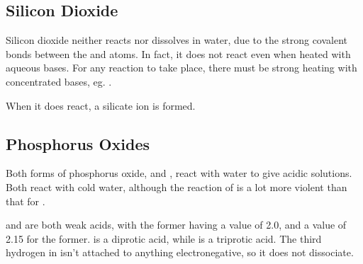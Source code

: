 


		\subsection{Silicon Dioxide}

			Silicon dioxide neither reacts nor dissolves in water, due to the strong covalent bonds between the  and  atoms.
			In fact, it does not react even when heated with aqueous bases. For any reaction to take place, there must be strong heating
			with concentrated bases, eg. .


			When it does react, a silicate ion is formed.




		\pagebreak
		\subsection{Phosphorus Oxides}

			Both forms of phosphorus oxide,  and , react with water to give acidic solutions. Both react with cold water,
			although the reaction of  is a lot more violent than that for .


			 and  are both weak acids, with the former having a \pKa{} value of \num{2.0}, and a value of \num{2.15} for the
			former.  is a diprotic acid, while  is a triprotic acid. The third hydrogen in  isn't attached to
			anything electronegative, so it does not dissociate.


